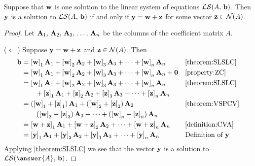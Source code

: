 \documentclass{ximera}
\begin{document}
\begin{theorem}
  \label{theorem:PSPHS}
  Suppose that $\mathbf{w}$ is one solution to the linear system of
  equations $\mathcal{LS}\!\left(A,\,\mathbf{b}\right)$.  Then $\mathbf{y}$ is a
  solution to $\mathcal{LS}\!\left(A,\,\mathbf{b}\right)$ if and only if
  $\mathbf{y}=\mathbf{w}+\mathbf{z}$ for some vector $\mathbf{z}\in\mathcal{N}\!\left(A\right)$.

  \begin{proof}
    Let $\mathbf{A}_{1},\,\mathbf{A}_{2},\,\mathbf{A}_{3},\,\ldots,\,\mathbf{A}_{n}$ be the columns of the coefficient matrix $A$.

    ($\Leftarrow$) Suppose $\mathbf{y}=\mathbf{w}+\mathbf{z}$ and
    $\mathbf{z}\in\mathcal{N}\!\left(A\right)$. Then
    \begin{align*}
      \mathbf{b}
      &=
        \left\lbrack\mathbf{w}\right\rbrack_{1}\mathbf{A}_1+
        \left\lbrack\mathbf{w}\right\rbrack_{2}\mathbf{A}_2+
        \left\lbrack\mathbf{w}\right\rbrack_{3}\mathbf{A}_3+
        \cdots+
        \left\lbrack\mathbf{w}\right\rbrack_{n}\mathbf{A}_n
      &&\ref{theorem:SLSLC}\\
      &=
        \left\lbrack\mathbf{w}\right\rbrack_{1}\mathbf{A}_1+
        \left\lbrack\mathbf{w}\right\rbrack_{2}\mathbf{A}_2+
        \left\lbrack\mathbf{w}\right\rbrack_{3}\mathbf{A}_3+
        \cdots+
        \left\lbrack\mathbf{w}\right\rbrack_{n}\mathbf{A}_n
        +\mathbf{0}
      &&\ref{property:ZC}\\
      &=
        \left\lbrack\mathbf{w}\right\rbrack_{1}\mathbf{A}_1+
        \left\lbrack\mathbf{w}\right\rbrack_{2}\mathbf{A}_2+
        \left\lbrack\mathbf{w}\right\rbrack_{3}\mathbf{A}_3+
        \cdots+
        \left\lbrack\mathbf{w}\right\rbrack_{n}\mathbf{A}_n
      &&\ref{theorem:SLSLC}\\
      &\quad\quad
        +
        \left\lbrack\mathbf{z}\right\rbrack_{1}\mathbf{A}_1+
        \left\lbrack\mathbf{z}\right\rbrack_{2}\mathbf{A}_2+
        \left\lbrack\mathbf{z}\right\rbrack_{3}\mathbf{A}_3+
        \cdots+
        \left\lbrack\mathbf{z}\right\rbrack_{n}\mathbf{A}_n\\
      &=
        \left(\left\lbrack\mathbf{w}\right\rbrack_{1}+\left\lbrack\mathbf{z}\right\rbrack_{1}\right)\mathbf{A}_1+
        \left(\left\lbrack\mathbf{w}\right\rbrack_{2}+\left\lbrack\mathbf{z}\right\rbrack_{2}\right)\mathbf{A}_2
      &&\ref{theorem:VSPCV}\\
      &\quad\quad
        \left(\left\lbrack\mathbf{w}\right\rbrack_{3}+\left\lbrack\mathbf{z}\right\rbrack_{3}\right)\mathbf{A}_3+
        \cdots+
        \left(\left\lbrack\mathbf{w}\right\rbrack_{n}+\left\lbrack\mathbf{z}\right\rbrack_{n}\right)\mathbf{A}_n\\
      &=
        \left\lbrack\mathbf{w}+\mathbf{z}\right\rbrack_{1}\mathbf{A}_1+
        \left\lbrack\mathbf{w}+\mathbf{z}\right\rbrack_{2}\mathbf{A}_2+
        \cdots+
        \left\lbrack\mathbf{w}+\mathbf{z}\right\rbrack_{n}\mathbf{A}_n
      &&\ref{definition:CVA}\\
      &=
        \left\lbrack\mathbf{y}\right\rbrack_{1}\mathbf{A}_1+
        \left\lbrack\mathbf{y}\right\rbrack_{2}\mathbf{A}_2+
        \left\lbrack\mathbf{y}\right\rbrack_{3}\mathbf{A}_3+
        \cdots+
        \left\lbrack\mathbf{y}\right\rbrack_{n}\mathbf{A}_n
      &&\text{Definition of $\mathbf{y}$}
    \end{align*}
    Applying \ref{theorem:SLSLC} we see that the vector $\mathbf{y}$ is
    a solution to $\linearsystem{\answer{A}}{\vect{b}}$.


\end{proof}
\end{theorem}
\end{document}

